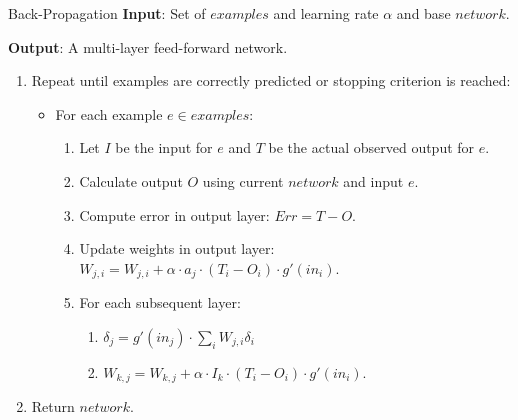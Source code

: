 \documentclass[english]{panikzettel}
\begin{document}
\begin{algo}{Back-Propagation}
\textbf{Input}: Set of $examples$ and learning rate $\alpha$ and base $network$.

\textbf{Output}: A multi-layer feed-forward network.
\tcblower
\begin{enumerate}
    \item Repeat until examples are correctly predicted or stopping criterion is reached:
        \begin{itemize}
            \item For each example $e \in examples$:
                \begin{enumerate}
                    \item Let $I$ be the input for $e$ and $T$ be the actual observed output for $e$.
                    \item Calculate output $O$ using current $network$ and input $e$.
                    \item Compute error in output layer: $Err = T - O$.
                    \item Update weights in output layer: $W_{j,i} = W_{j,i} + \alpha \cdot a_j \cdot (T_i - O_i) \cdot g'(in_i)$.
                    \item For each subsequent layer:
                        \begin{enumerate}
                            \item $\delta_j = g'(in_j) \cdot \sum_i W_{j,i} \delta_i$
                            \item $W_{k,j} = W_{k,j} + \alpha \cdot I_k \cdot (T_i - O_i) \cdot g'(in_i)$.
                        \end{enumerate}
                \end{enumerate}
        \end{itemize}
    \item Return $network$.
\end{enumerate}
\end{algo}
\end{document}
